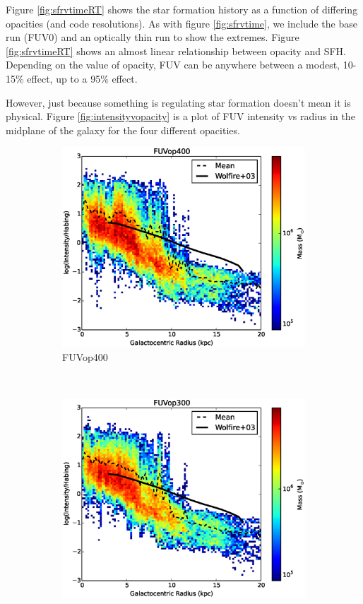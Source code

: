 Figure \ref{fig:sfrvtimeRT} shows the star formation history as a function of differing opacities (and code resolutions). As with figure \ref{fig:sfrvtime}, we include the base run (FUV0) and an optically thin run to show the extremes. Figure \ref{fig:sfrvtimeRT} shows an almost linear relationship between opacity and SFH. Depending on the value of opacity, FUV can be anywhere between a modest, 10-15\% effect, up to a 95\% effect.

However, just because something is regulating star formation doesn't mean it is physical. Figure \ref{fig:intensityvopacity} is a plot of FUV intensity vs radius in the midplane of the galaxy for the four different opacities.

\begin{figure}
        \centering
        \begin{subfigure}[b]{0.45\textwidth}
                \includegraphics[width=\textwidth]{graphics/intensityvrRadFUVop400_J300200.eps}
                \caption{FUVop400}
                \label{fig:intensityop400}
        \end{subfigure}
        ~ 
        \begin{subfigure}[b]{0.45\textwidth}
                \includegraphics[width=\textwidth]{graphics/intensityvrRadFUV_J300200.eps}

\end{subfigure}
\end{figure}
